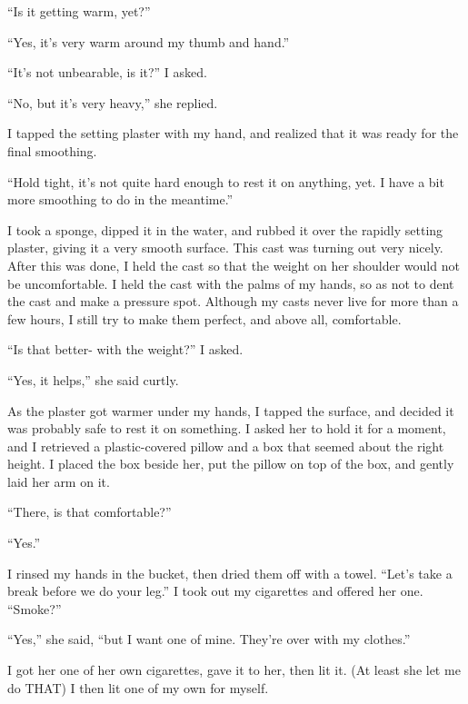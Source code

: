 ``Is it getting warm, yet?''

``Yes, it's very warm around my thumb and hand.''

``It's not unbearable, is it?'' I asked.

``No, but it's very heavy,'' she replied.

I tapped the setting plaster with my hand, and realized that it was ready for the final
smoothing.

``Hold tight, it's not quite hard enough to rest it on anything, yet. I have a bit more
smoothing to do in the meantime.''

I took a sponge, dipped it in the water, and rubbed it over the rapidly setting plaster,
giving it a very smooth surface. This cast was turning out very nicely. After this was done, I
held the cast so that the weight on her shoulder would not be uncomfortable. I held the cast
with the palms of my hands, so as not to dent the cast and make a pressure spot. Although my
casts never live for more than a few hours, I still try to make them perfect, and above all,
comfortable.

``Is that better- with the weight?'' I asked.

``Yes, it helps,'' she said curtly.

As the plaster got warmer under my hands, I tapped the surface, and decided it was probably
safe to rest it on something. I asked her to hold it for a moment, and I retrieved a
plastic-covered pillow and a box that seemed about the right height. I placed the box beside
her, put the pillow on top of the box, and gently laid her arm on it.

``There, is that comfortable?''

``Yes.''

I rinsed my hands in the bucket, then dried them off with a towel. ``Let's take a break
before we do your leg.'' I took out my cigarettes and offered her one. ``Smoke?''

``Yes,'' she said, ``but I want one of mine. They're over with my clothes.''

I got her one of her own cigarettes, gave it to her, then lit it. (At least she let me do
THAT) I then lit one of my own for myself.

